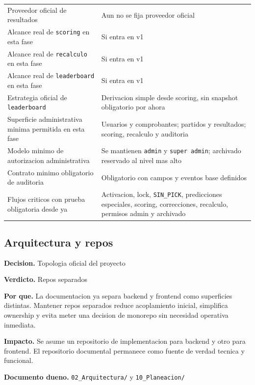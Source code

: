 \begin{longtable}{p{}p{}}
Proveedor oficial de resultados & Aun no se fija proveedor oficial \\
Alcance real de \texttt{scoring} en esta fase & Si entra en v1 \\
Alcance real de \texttt{recalculo} en esta fase & Si entra en v1 \\
Alcance real de \texttt{leaderboard} en esta fase & Si entra en v1 \\
Estrategia oficial de \texttt{leaderboard} & Derivacion simple desde scoring, sin snapshot obligatorio por ahora \\
Superficie administrativa minima permitida en esta fase & Usuarios y comprobantes; partidos y resultados; scoring, recalculo y auditoria \\
Modelo minimo de autorizacion administrativa & Se mantienen \texttt{admin} y \texttt{super admin}; archivado reservado al nivel mas alto \\
Contrato minimo obligatorio de auditoria & Obligatorio con campos y eventos base definidos \\
Flujos criticos con prueba obligatoria desde ya & Activacion, lock, \texttt{SIN\_PICK}, predicciones especiales, scoring, correcciones, recalculo, permisos admin y archivado \\
\bottomrule
\end{longtable}

\subsection{Arquitectura y repos}

\begin{docnote}
\textbf{Decision.} Topologia oficial del proyecto

\textbf{Verdicto.} Repos separados

\textbf{Por que.} La documentacion ya separa backend y frontend como superficies distintas. Mantener repos separados reduce acoplamiento inicial, simplifica ownership y evita meter una decision de monorepo sin necesidad operativa inmediata.

\textbf{Impacto.} Se asume un repositorio de implementacion para backend y otro para frontend. El repositorio documental permanece como fuente de verdad tecnica y funcional.

\textbf{Documento dueno.} \texttt{02\_Arquitectura/} y \texttt{10\_Planeacion/}
\end{docnote}

